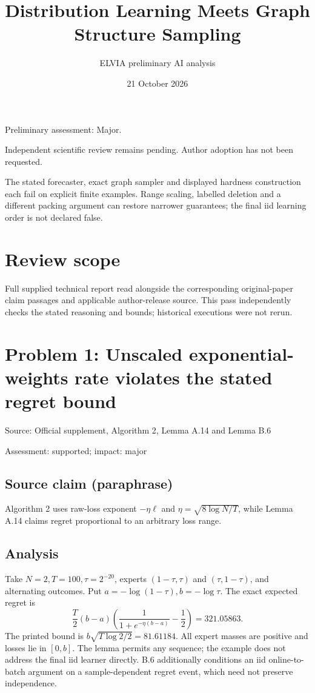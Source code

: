 \documentclass[11pt]{article}
\begin{document}
\title{Distribution Learning Meets Graph Structure Sampling}

\author{ELVIA preliminary AI analysis}\date{21 October 2026}\maketitle

Preliminary assessment: Major.\par

Independent scientific review remains pending. Author adoption has not been requested.

The stated forecaster, exact graph sampler and displayed hardness construction each fail on explicit finite examples. Range scaling, labelled deletion and a different packing argument can restore narrower guarantees; the final iid learning order is not declared false.

\section*{Review scope}

Full supplied technical report read alongside the corresponding original-paper claim passages and applicable author-release source. This pass independently checks the stated reasoning and bounds; historical executions were not rerun.

\section*{Problem 1: Unscaled exponential-weights rate violates the stated regret bound}

Source: Official supplement, Algorithm 2, Lemma A.14 and Lemma B.6

Assessment: supported; impact: major

\subsection*{Source claim (paraphrase)}

Algorithm 2 uses raw-loss exponent \(-\eta\ell\) and \(\eta=\sqrt{8\log N/T}\), while Lemma A.14 claims regret proportional to an arbitrary loss range.

\subsection*{Analysis}

Take \(N=2,T=100,\tau=2^{-20}\), experts \((1-\tau,\tau)\) and \((\tau,1-\tau)\), and alternating outcomes. Put \(a=-\log(1-\tau),b=-\log\tau\). The exact expected regret is \[\frac{T}{2}(b-a)\left(\frac{1}{1+e^{-\eta(b-a)}}-\frac12\right)=321.05863.\] The printed bound is \(b\sqrt{T\log2/2}=81.61184\). All expert masses are positive and losses lie in \([0,b]\). The lemma permits any sequence; the example does not address the final iid learner directly. B.6 additionally conditions an iid online-to-batch argument on a sample-dependent regret event, which need not preserve independence.
\end{document}
